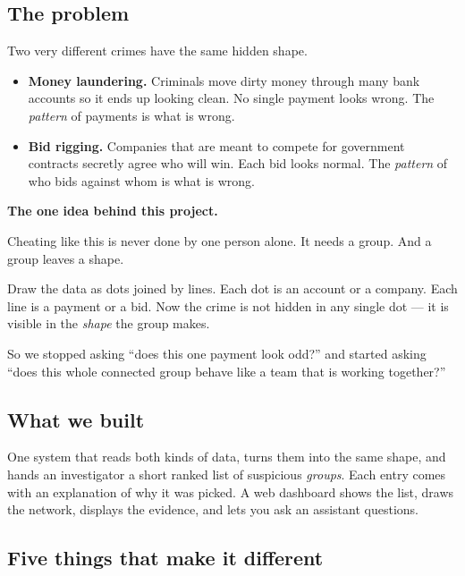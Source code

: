 \documentclass[11pt,a4paper]{article}
\begin{document}
\subsection{The problem}

Two very different crimes have the same hidden shape.

\begin{itemize}
  \item \textbf{Money laundering.} Criminals move dirty money through many bank
        accounts so it ends up looking clean. No single payment looks wrong. The
        \emph{pattern} of payments is what is wrong.
  \item \textbf{Bid rigging.} Companies that are meant to compete for government
        contracts secretly agree who will win. Each bid looks normal. The
        \emph{pattern} of who bids against whom is what is wrong.
\end{itemize}

\begin{keybox}
\textbf{The one idea behind this project.}

Cheating like this is never done by one person alone. It needs a group. And a
group leaves a shape.

Draw the data as dots joined by lines. Each dot is an account or a company. Each
line is a payment or a bid. Now the crime is not hidden in any single dot --- it
is visible in the \emph{shape} the group makes.

So we stopped asking ``does this one payment look odd?'' and started asking
``does this whole connected group behave like a team that is working together?''
\end{keybox}

\subsection{What we built}

One system that reads both kinds of data, turns them into the same shape, and
hands an investigator a short ranked list of suspicious \emph{groups}. Each entry
comes with an explanation of why it was picked. A web dashboard shows the list,
draws the network, displays the evidence, and lets you ask an assistant
questions.

\subsection{Five things that make it different}
\end{document}
